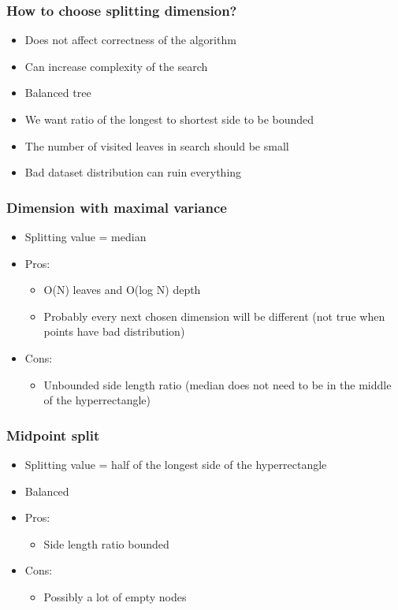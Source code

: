 \documentclass{beamer}
\begin{document}
\begin{frame}
 \frametitle{How to choose splitting dimension?}
 \begin{itemize}
  \item Does not affect correctness of the algorithm
  \item Can increase complexity of the search
  \item Balanced tree
  \item We want ratio of the longest to shortest side to be bounded
  \item The number of visited leaves in search should be small
  \item Bad dataset distribution can ruin everything
 \end{itemize}

\end{frame}

\begin{frame}
 \frametitle{Dimension with maximal variance}
 \begin{itemize}
  \item Splitting value = median
  \item Pros:
  \begin{itemize}
   \item O(N) leaves and O(log N) depth
   \item Probably every next chosen dimension will be different (not true when points have bad distribution)
  \end{itemize}
  
  \item Cons:
  \begin{itemize}
   \item Unbounded side length ratio (median does not need to be in the middle of the hyperrectangle)
  \end{itemize}

 \end{itemize}

\end{frame}

\begin{frame}
 \frametitle{Midpoint split}
 \begin{itemize}
  \item Splitting value = half of the longest side of the hyperrectangle
  \item Balanced
  \item Pros:
  \begin{itemize}
   \item Side length ratio bounded
   \end{itemize}
   
   \item Cons:
  \begin{itemize}
   \item Possibly a lot of empty nodes
   \end{itemize}
   
  
 \end{itemize}

\end{frame}
\end{document}
